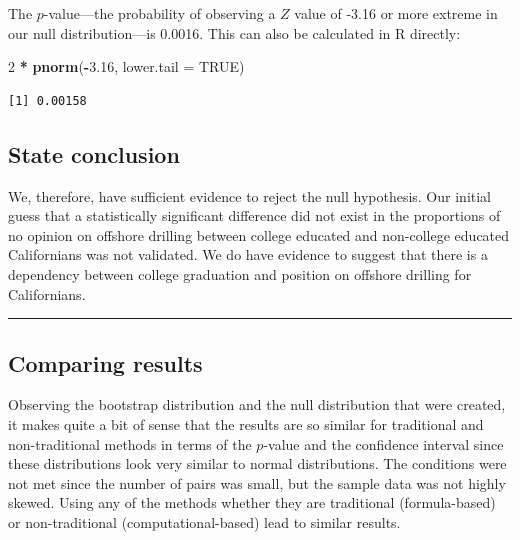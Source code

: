 \documentclass[12pt, krantz2,]{krantz}
\makeatletter
\newenvironment{Shaded}{\begin{snugshade}}{\end{snugshade}}
\newcommand{\DataTypeTok}[1]{\textcolor[rgb]{0.27,0.27,0.27}{#1}}
\newcommand{\DecValTok}[1]{\textcolor[rgb]{0.06,0.06,0.06}{#1}}
\newcommand{\FloatTok}[1]{\textcolor[rgb]{0.06,0.06,0.06}{#1}}
\newcommand{\KeywordTok}[1]{\textcolor[rgb]{0.27,0.27,0.27}{\textbf{#1}}}
\newcommand{\NormalTok}[1]{#1}
\newcommand{\OperatorTok}[1]{\textcolor[rgb]{0.43,0.43,0.43}{\textbf{#1}}}
\newcommand{\OtherTok}[1]{\textcolor[rgb]{0.37,0.37,0.37}{#1}}
\newcommand{\StringTok}[1]{\textcolor[rgb]{0.5,0.5,0.5}{#1}}
\newenvironment{kframe}{%
\medskip{}
\setlength{\fboxsep}{.8em}
 \def\at@end@of@kframe{}%
 \ifinner\ifhmode%
  \def\at@end@of@kframe{\end{minipage}}%
  \begin{minipage}{\columnwidth}%
 \fi\fi%
 \def\FrameCommand##1{\hskip\@totalleftmargin \hskip-\fboxsep
 \colorbox{shadecolor}{##1}\hskip-\fboxsep
     \hskip-\linewidth \hskip-\@totalleftmargin \hskip\columnwidth}%
 \MakeFramed {\advance\hsize-\width
   \@totalleftmargin\z@ \linewidth\hsize
   \@setminipage}}%
 {\par\unskip\endMakeFramed%
 \at@end@of@kframe}
\renewenvironment{Shaded}{\begin{kframe}}{\end{kframe}}
\makeatother
\begin{document}
The \(p\)-value---the probability of observing a \(Z\) value of -3.16 or more extreme in our null distribution---is 0.0016. This can also be calculated in R directly:

\begin{Shaded}
\begin{Highlighting}[]
\DecValTok{2} \OperatorTok{*}\StringTok{ }\KeywordTok{pnorm}\NormalTok{(}\OperatorTok{-}\FloatTok{3.16}\NormalTok{, }\DataTypeTok{lower.tail =} \OtherTok{TRUE}\NormalTok{)}
\end{Highlighting}
\end{Shaded}

\begin{verbatim}
[1] 0.00158
\end{verbatim}

\hypertarget{state-conclusion-2}{%
\subsection{State conclusion}\label{state-conclusion-2}}

We, therefore, have sufficient evidence to reject the null hypothesis. Our initial guess that a statistically significant difference did not exist in the proportions of no opinion on offshore drilling between college educated and non-college educated Californians was not validated. We do have evidence to suggest that there is a dependency between college graduation and position on offshore drilling for Californians.

\begin{center}\rule{0.5\linewidth}{\linethickness}\end{center}

\hypertarget{comparing-results-2}{%
\subsection{Comparing results}\label{comparing-results-2}}

Observing the bootstrap distribution and the null distribution that were created, it makes quite a bit of sense that the results are so similar for traditional and non-traditional methods in terms of the \(p\)-value and the confidence interval since these distributions look very similar to normal distributions. The conditions were not met since the number of pairs was small, but the sample data was not highly skewed. Using any of the methods whether they are traditional (formula-based) or non-traditional (computational-based) lead to similar results.
\end{document}
